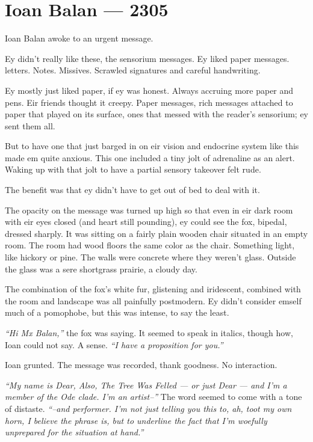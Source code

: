 \hypertarget{ioan-balan-2305}{%
\chapter*{Ioan Balan — 2305}\label{ioan-balan-2305}}

Ioan Balan awoke to an urgent message.

Ey didn't really like these, the sensorium messages. Ey liked paper messages. letters. Notes. Missives. Scrawled signatures and careful handwriting.

Ey mostly just liked paper, if ey was honest. Always accruing more paper and pens. Eir friends thought it creepy. Paper messages, rich messages attached to paper that played on its surface, ones that messed with the reader's sensorium; ey sent them all.

But to have one that just barged in on eir vision and endocrine system like this made em quite anxious. This one included a tiny jolt of adrenaline as an alert. Waking up with that jolt to have a partial sensory takeover felt rude.

The benefit was that ey didn't have to get out of bed to deal with it.

The opacity on the message was turned up high so that even in eir dark room with eir eyes closed (and heart still pounding), ey could see the fox, bipedal, dressed sharply. It was sitting on a fairly plain wooden chair situated in an empty room. The room had wood floors the same color as the chair. Something light, like hickory or pine. The walls were concrete where they weren't glass. Outside the glass was a sere shortgrass prairie, a cloudy day.

The combination of the fox's white fur, glistening and iridescent, combined with the room and landscape was all painfully postmodern. Ey didn't consider emself much of a pomophobe, but this was intense, to say the least.

\emph{``Hi Mx Balan,''} the fox was saying. It seemed to speak in italics, though how, Ioan could not say. A sense. \emph{``I have a proposition for you.''}

Ioan grunted. The message was recorded, thank goodness. No interaction.

\emph{``My name is Dear, Also, The Tree Was Felled — or just Dear — and I'm a member of the Ode clade. I'm an artist--''} The word seemed to come with a tone of distaste. \emph{``--and performer. I'm not just telling you this to, ah, toot my own horn, I believe the phrase is, but to underline the fact that I'm woefully unprepared for the situation at hand.''}

